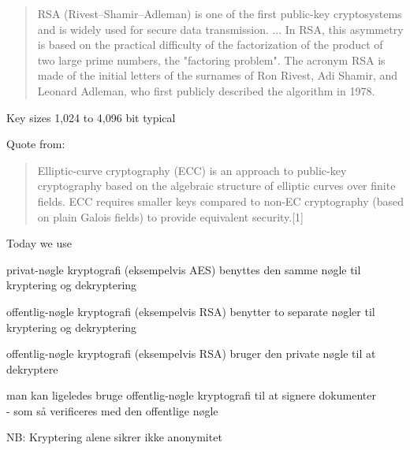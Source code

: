 \documentclass[Screen16to9,17pt]{foils}
\begin{document}

\begin{quote}
RSA (Rivest–Shamir–Adleman) is one of the first public-key cryptosystems and is widely used for secure data transmission. ...
In RSA, this asymmetry is based on the practical difficulty of the factorization of the product of two large prime numbers, the "factoring problem". The acronym RSA is made of the initial letters of the surnames of Ron Rivest, Adi Shamir, and Leonard Adleman, who first publicly described the algorithm in 1978.
\end{quote}

\begin{list2}
\item Key sizes	1,024 to 4,096 bit typical
\item  Quote from: 
\end{list2}




\begin{quote}
Elliptic-curve cryptography (ECC) is an approach to public-key cryptography based on the algebraic structure of elliptic curves over finite fields. ECC requires smaller keys compared to non-EC cryptography (based on plain Galois fields) to provide equivalent security.[1]
\end{quote}

\begin{list2}
\item Today we use 
\end{list2}




\begin{list1}
\item privat-nøgle kryptografi (eksempelvis AES) benyttes den samme
  nøgle til kryptering og dekryptering
\item offentlig-nøgle kryptografi (eksempelvis RSA) benytter to
  separate nøgler til kryptering og dekryptering
\end{list1}



\begin{list1}
\item offentlig-nøgle kryptografi (eksempelvis RSA) bruger den private
  nøgle til at dekryptere
\item man kan ligeledes bruge offentlig-nøgle kryptografi til at
  signere dokumenter\\ - som så verificeres med den offentlige nøgle
\item NB: Kryptering alene sikrer ikke anonymitet
\end{list1}
\end{document}
